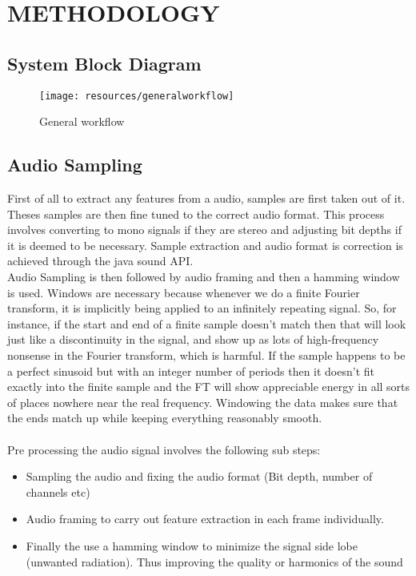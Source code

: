 \newpage
\section{METHODOLOGY}

\subsection{System Block Diagram}

\begin{figure}[h]
        \centering
        \texttt{[image: resources/generalworkflow]}
        \caption{General workflow}
\end{figure}

\subsection{Audio Sampling}
First of all to extract any features from a audio, samples are first taken out of it. Theses samples are then fine tuned to the correct audio format. This process involves converting to mono signals if they are stereo and adjusting bit depths if it is deemed to be necessary. Sample extraction and audio format is correction is achieved through the java sound API.\\
Audio Sampling is then followed by audio framing and then a hamming window is used. Windows are necessary because whenever we do a finite Fourier transform, it is implicitly being applied to an infinitely repeating signal. So, for instance, if the start and end of a finite sample doesn’t match then that will look just like a discontinuity in the signal, and show up as lots of high-frequency nonsense in the Fourier transform, which is harmful. If the sample happens to be a perfect sinusoid but with an integer number of periods then it doesn't fit exactly into the finite sample and the FT will show appreciable energy in all sorts of places nowhere near the real frequency. Windowing the data makes sure that the ends match up while keeping everything reasonably smooth.\\
\\
Pre processing the audio signal involves the following sub steps:

\begin{itemize}

        \item Sampling the audio and fixing the audio format (Bit depth, number of channels etc) 

        \item Audio framing to carry out feature extraction in each frame individually. 

        \item Finally the use a hamming window to minimize the signal side lobe (unwanted radiation). Thus improving the quality or harmonics of the sound

\end{itemize}

